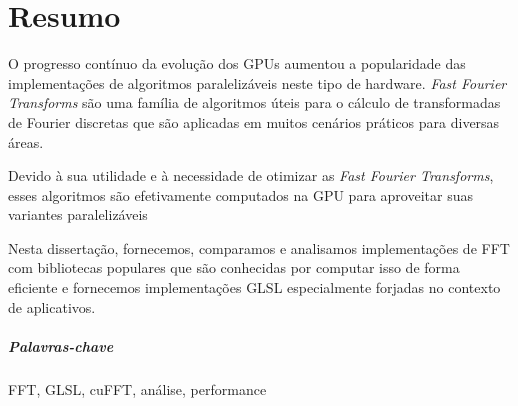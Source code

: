 \documentclass[
  oneside,
  11pt, a4paper,
  footinclude=true,
  headinclude=true,
  cleardoublepage=empty
]{scrbook}
\begin{document}
    \cleardoublepage


\chapter*{Resumo}

O progresso contínuo da evolução dos GPUs aumentou a popularidade das implementações de algoritmos paralelizáveis ​​neste tipo de hardware.
\textit{Fast Fourier Transforms} são uma família de algoritmos úteis para o cálculo de transformadas de Fourier discretas que são aplicadas em muitos cenários práticos para diversas áreas.

Devido à sua utilidade e à necessidade de otimizar as \textit{Fast Fourier Transforms}, esses algoritmos são efetivamente computados na GPU para aproveitar suas variantes paralelizáveis

Nesta dissertação, fornecemos, comparamos e analisamos implementações de FFT com bibliotecas populares que são conhecidas por computar isso de forma eficiente e fornecemos implementações GLSL especialmente forjadas no contexto de aplicativos.
    
\paragraph{Palavras-chave} FFT, GLSL, cuFFT, análise, performance


    \cleardoublepage
    
    \setcounter{page}{3}
    
    \cleardoublepage
    \tableofcontents
    
    \cleardoublepage
    \listoffigures
    
    \cleardoublepage
    \listoftables
    

    
    \cleardoublepage
    \setcounter{page}{5}


\end{document}
